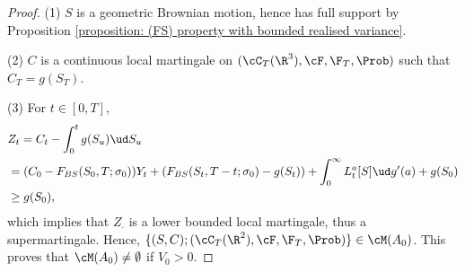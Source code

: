 \documentclass[11pt]{article}
\begin{document}
\begin{proof}
\item  (1) $S$ is a geometric Brownian motion, hence has full support by Proposition \ref{proposition: (FS) property with bounded realised variance}.

\item  (2) $C$ is a continuous local martingale on $(\cC_T(\R^3), \cF, \F_T, \Prob)$ such that $C_T = g(S_T)$.
\item (3) For $t \in [0,T]$,
\begin{align*}
&Z_t = C_t - \int_0^t g(S_u) \ud S_u \\
&= (C_0 - F_{BS}(S_0, T; \sigma_0)) Y_t + (F_{BS}(S_t, T - t; \sigma_0) - g(S_t)) + \int_0^\infty L^a_t [S] \ud g^\prime(a) + g(S_0) \\
%
%
%
&\geq g(S_0),
\end{align*}
which implies that $Z_\cdot$ is a lower bounded local martingale, thus a supermartingale. Hence, $\{ (S,C) ; (\cC_T(\R^2), \cF, \F_T, \Prob) \} \in \cM(A_0)$. This proves that $\cM(A_0) \neq \emptyset$ if $V_0 > 0$.

\end{proof}
\end{document}
